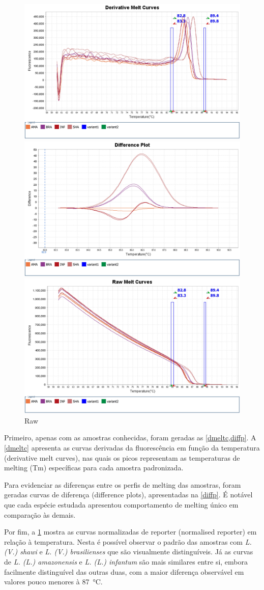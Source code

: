 \begin{figure}
        \centering
        \includegraphics[width=.4\textwidth]{fig/Derivative Melt Curves.jpg}
        \caption{foto 1}
        \label{dmeltc}
        \includegraphics[width=.4\textwidth]{fig/Difference Plot.jpg}
        \caption{foto 1}
        \label{diffp}
        \includegraphics[width=.4\textwidth]{fig/Raw Melt Curves.jpg}
        \caption{Raw}
        \label{rawmelt}
\end{figure} %

Primeiro, apenas com as amostras conhecidas, foram geradas as
\cref{dmeltc,diffp}. A
\cref{dmeltc} apresenta as curvas derivadas da fluorescência em função da
temperatura (derivative melt curves), nas quais os picos representam as
temperaturas de melting (Tm) específicas para cada amostra padronizada.

Para evidenciar as diferenças entre os perfis de melting das
amostras, foram geradas curvas de diferença (difference plots), apresentadas na
\cref{diffp}. 
É notável que cada espécie estudada
apresentou comportamento de melting único em comparação às demais. 

Por fim, a \cref{rawmelt} mostra as curvas normalizadas de reporter (normalised
reporter) em relação à
temperatura. Nesta é possível observar o padrão das amostras com \textit{L. (V.) shawi} e
\textit{L. (V.) brasilienses} que são visualmente distinguíveis. Já as curvas de
\textit{L. (L.) amazonensis} e \textit{L. (L.) infantum} são mais similares
entre si, embora facilmente distinguível das outras duas,  com
a maior diferença observável em valores pouco menores à \qty{87}{\celsius}.

